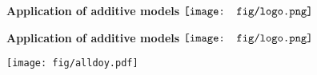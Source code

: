 \documentclass{beamer}
\begin{document}
\begin{frame}{\textbf{Application of additive models} \hspace{0pt plus 1 filll} $\vcenter{\hbox{\texttt{[image: fig/logo.png]}}}$}
\vspace{-0.2in}
\begin{center}
\end{center}
\end{frame}

\begin{frame}{\textbf{Application of additive models} \hspace{0pt plus 1 filll} $\vcenter{\hbox{\texttt{[image: fig/logo.png]}}}$}
\vspace{-0.15in}
\begin{center}
\texttt{[image: fig/alldoy.pdf]}
\end{center}
\end{frame}
\end{document}
